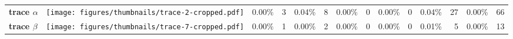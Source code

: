 \begin{tabular}{@{}llcrcrcrcrcrcr@{}}
 \bottomrule
\multicolumn{1}{l}{\textbf{trace \boldmath$\alpha$}} & \multicolumn{1}{l|}{\texttt{[image: figures/thumbnails/trace-2-cropped.pdf]}}  & \colorbox{orange!0!white}{0.00\%} & 3 & \colorbox{orange!15!white}{0.04\%} & 8 & \colorbox{orange!0!white}{0.00\%} & 0 & \colorbox{orange!0!white}{0.00\%} & 0 & \colorbox{orange!15!white}{0.04\%} & 27 & \colorbox{orange!0!white}{0.00\%} & 66\\
\multicolumn{1}{l}{\textbf{trace \boldmath$\beta$}} & \multicolumn{1}{l|}{\texttt{[image: figures/thumbnails/trace-7-cropped.pdf]}}  & \colorbox{orange!0!white}{0.00\%} & 1 & \colorbox{orange!0!white}{0.00\%} & 2 & \colorbox{orange!0!white}{0.00\%} & 0 & \colorbox{orange!0!white}{0.00\%} & 0 & \colorbox{orange!15!white}{0.01\%} & 5 & \colorbox{orange!0!white}{0.00\%} & 13\\
\bottomrule
\end{tabular}
